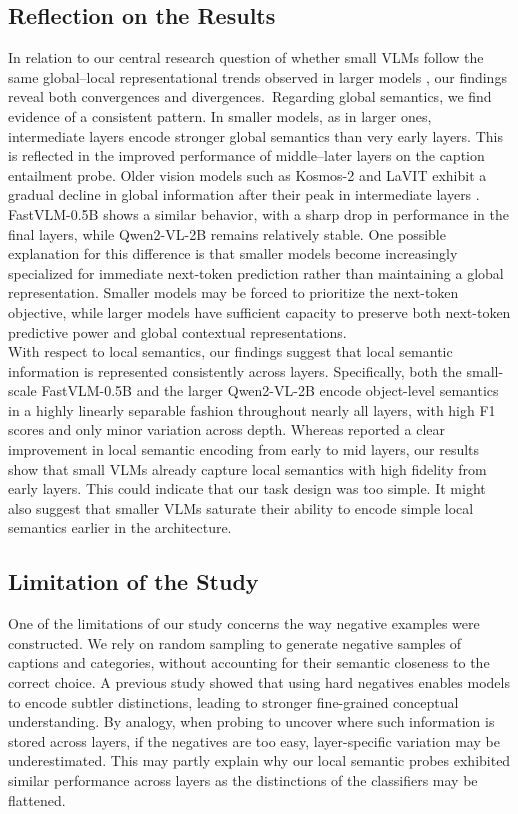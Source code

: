 \documentclass[11pt]{article}
\begin{document}
\subsection{Reflection on the Results}
In relation to our central research question of whether small VLMs follow the same global–local representational trends observed in larger models \cite{tao2024probingmultimodallargelanguage}, our findings reveal both convergences and divergences.\
Regarding global semantics, we find evidence of a consistent pattern.
In smaller models, as in larger ones, intermediate layers encode stronger global semantics than very early layers.
This is reflected in the improved performance of middle–later layers on the caption entailment probe.
Older vision models such as Kosmos-2 and LaVIT exhibit a gradual decline in global information after their peak in intermediate layers \cite{tao2024probingmultimodallargelanguage}.
FastVLM-0.5B shows a similar behavior, with a sharp drop in performance in the final layers, while Qwen2-VL-2B remains relatively stable.
One possible explanation for this difference is that smaller models become increasingly specialized for immediate next-token prediction rather than maintaining a global representation.
Smaller models may be forced to prioritize the next-token objective, while larger models have sufficient capacity to preserve both next-token predictive power and global contextual representations.\\
With respect to local semantics, our findings suggest that local semantic information is represented consistently across layers.
Specifically, both the small-scale FastVLM-0.5B and the larger Qwen2-VL-2B encode object-level semantics in a highly linearly separable fashion throughout nearly all layers, with high F1 scores and only minor variation across depth.
Whereas \cite{tao2024probingmultimodallargelanguage} reported a clear improvement in local semantic encoding from early to mid layers, our results show that small VLMs already capture local semantics with high fidelity from early layers.
This could indicate that our task design was too simple.
It might also suggest that smaller VLMs saturate their ability to encode simple local semantics earlier in the architecture.

\subsection{Limitation of the Study}
One of the limitations of our study concerns the way negative examples were constructed. We rely on random sampling to generate negative samples of captions and categories, without accounting for their semantic closeness to the correct choice.
A previous study \cite{roesch2024EnhancingConceptualUnderstandinginMultimodal} showed that using hard negatives enables models to encode subtler distinctions, leading to stronger fine-grained conceptual understanding.
By analogy, when probing to uncover where such information is stored across layers, if the negatives are too easy, layer-specific variation may be underestimated.
This may partly explain why our local semantic probes exhibited similar performance across layers as the distinctions of the classifiers may be flattened. \\
\end{document}
